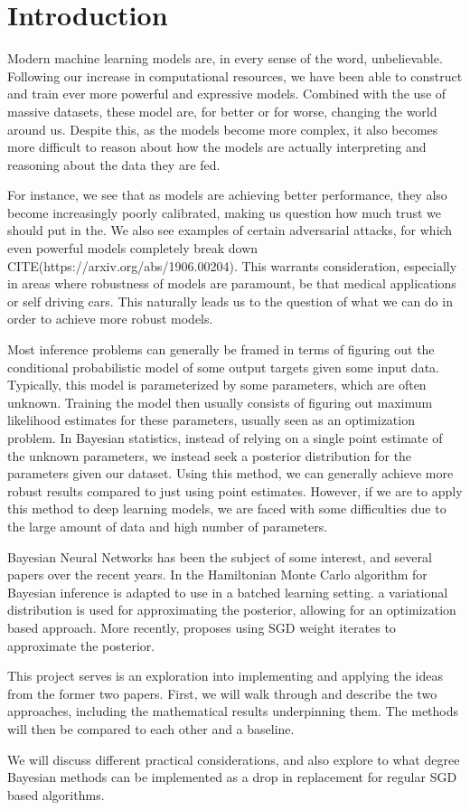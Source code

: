 \chapter{Introduction}
Modern machine learning models are, in every sense of the word, unbelievable. 
Following our increase in computational resources, we have been able to construct and train ever more powerful and expressive models.
Combined with the use of massive datasets, these model are, for better or for worse, changing the world around us. 
Despite this, as the models become more complex, it also becomes more difficult to reason about how the models are actually interpreting and reasoning about the data they are fed.

For instance, we see that as models are achieving better performance, they also become increasingly poorly calibrated\cite{guo_calibration_2017}, making us question how much trust we should put in the. 
We also see examples of certain adversarial attacks, for which even powerful models completely break down CITE(https://arxiv.org/abs/1906.00204).
This warrants consideration, especially in areas where robustness of models are paramount, be that medical applications or self driving cars. 
This naturally leads us to the question of what we can do in order to achieve more robust models.

Most inference problems can generally be framed in terms of figuring out the conditional probabilistic model of some output targets given some input data.
Typically, this model is parameterized by some parameters, which are often unknown.
Training the model then usually consists of figuring out maximum likelihood estimates for these parameters, usually seen as an optimization problem.
In Bayesian statistics, instead of relying on a single point estimate of the unknown parameters, we instead seek a posterior distribution for the parameters given our dataset.
Using this method, we can generally achieve more robust results compared to just using point estimates. 
However, if we are to apply this method to deep learning models, we are faced with some difficulties due to the large amount of data and high number of parameters.

Bayesian Neural Networks has been the subject of some interest, and several papers over the recent years. 
In \cite{chen_stochastic_2014} the Hamiltonian Monte Carlo algorithm for Bayesian inference is adapted to use in a batched learning setting. 
\cite{blundell_weight_2015} a variational distribution is used for approximating the posterior, allowing for an optimization based approach.
More recently, \cite{wilson_bayesian_2019} proposes using SGD weight iterates to approximate the posterior.

This project serves is an exploration into implementing and applying the ideas from the former two papers.
First, we will walk through and describe the two approaches, including the mathematical results underpinning them.
The methods will then be compared to each other and a baseline.

We will discuss different practical considerations, and also explore to what degree Bayesian methods can be implemented as a drop in replacement for regular SGD based algorithms.
